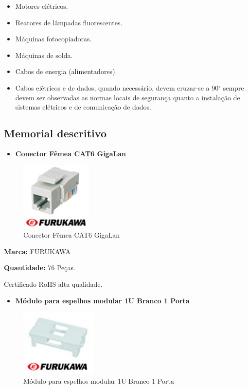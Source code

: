 \documentclass[	DIV=calc,%
							paper=a4,%
							fontsize=12pt,%
							onecolumn]{scrartcl}	 					%
\begin{document}
\begin{itemize}	
	\item Motores elétricos. 
	\item Reatores de lâmpadas fluorescentes.
	\item Máquinas fotocopiadoras.
	\item Máquinas de solda.
	\item Cabos de energia (alimentadores). 
	\item Cabos elétricos e de dados, quando necessário, devem cruzar-se a 90$^\circ$ sempre devem ser observadas as normas locais de segurança quanto a instalação de sistemas elétricos e de comunicação de dados.
\end{itemize}


\subsection{Memorial descritivo}

\begin{itemize}
	\item \textbf{Conector Fêmea CAT6 GigaLan} 
\end{itemize}

\begin{figure}
	\centering
	\caption{Conector Fêmea CAT6 GigaLan}
	\includegraphics{keystone1}
\end{figure}

\textbf{Marca:} FURUKAWA 

\textbf{Quantidade:} 76 Peças.

Certificado RoHS alta qualidade.

\begin{itemize}
	\item \textbf{Módulo para espelhos modular 1U Branco 1 Porta} 
\end{itemize}

\begin{figure}
	\centering
	\caption{Módulo para espelhos modular 1U Branco 1 Porta}
	\includegraphics{espelho1}
\end{figure}
\end{document}
